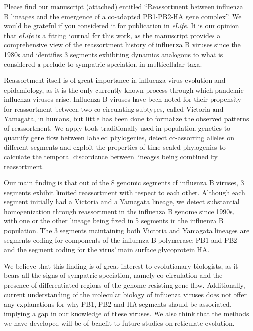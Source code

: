 \documentclass[stdletter,letterpaper,addrfromright,orderfromdateto,dateleft,11pt,noaddrto,sigleft]{newlfm}
\begin{document}
\begin{newlfm}
Please find our manuscript (attached) entitled ``Reassortment between influenza B lineages and the emergence of a co-adapted PB1-PB2-HA gene complex''. 
We would be grateful if you considered it for publication in \textit{eLife}.
It is our opinion that \textit{eLife} is a fitting journal for this work, as the manuscript provides a comprehensive view of the reassortment history of influenza B viruses since the 1980s and identifies 3 segments exhibiting dynamics analogous to what is considered a prelude to sympatric speciation in multicellular taxa.

Reassortment itself is of great importance in influenza virus evolution and epidemiology, as it is the only currently known process through which pandemic influenza viruses arise.
Influenza B viruses have been noted for their propensity for reassortment between two co-circulating subtypes, called Victoria and Yamagata, in humans, but little has been done to formalize the observed patterns of reassortment.
We apply tools traditionally used in population genetics to quantify gene flow between labeled phylogenies, detect co-assorting alleles on different segments and exploit the properties of time scaled phylogenies to calculate the temporal discordance between lineages being combined by reassortment.

Our main finding is that out of the 8 genomic segments of influenza B viruses, 3 segments exhibit limited reassortment with respect to each other.
Although each segment initially had a Victoria and a Yamagata lineage, we detect substantial homogenization through reassortment in the influenza B genome since 1990s, with one or the other lineage being fixed in 5 segments in the influenza B population.
The 3 segments maintaining both Victoria and Yamagata lineages are segments coding for components of the influenza B polymerase: PB1 and PB2 and the segment coding for the virus' main surface glycoprotein HA.

We believe that this finding is of great interest to evolutionary biologists, as it bears all the signs of sympatric speciation, namely co-circulation and the presence of differentiated regions of the genome resisting gene flow.
Additionally, current understanding of the molecular biology of influenza viruses does not offer any explanations for why PB1, PB2 and HA segments should be associated, implying a gap in our knowledge of these viruses.
We also think that the methods we have developed will be of benefit to future studies on reticulate evolution.

\end{newlfm}
\end{document}
